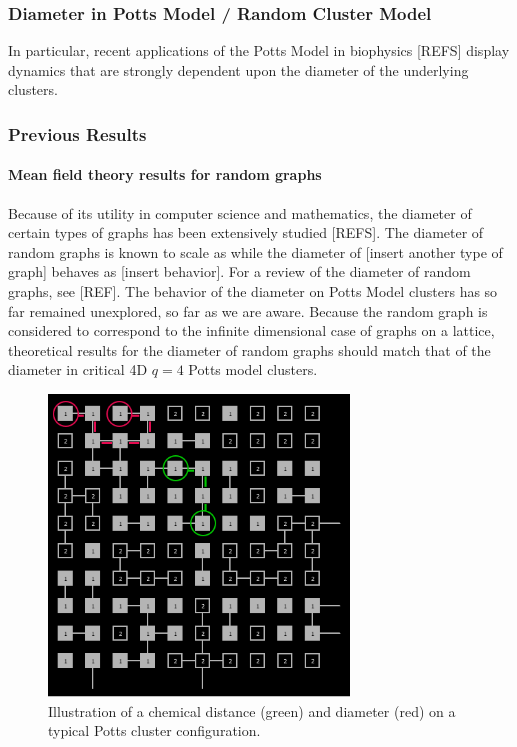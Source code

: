 \documentclass{article}
\begin{document}
\subsubsection{Diameter in Potts Model / Random Cluster Model}
\label{sec-1.3.2}

In particular, recent applications of the Potts Model in biophysics [REFS] display dynamics that are strongly dependent upon the diameter of the underlying clusters.
\subsubsection{Previous Results}
\label{sec-1.3.3}
\paragraph{Mean field theory results for random graphs}
\label{sec-1.3.3.1}

Because of its utility in computer science and mathematics, the diameter of certain types of graphs has been extensively studied [REFS].  The diameter of random graphs is known to scale as 
while the diameter of [insert another type of graph] behaves as [insert behavior].  For a review of the diameter of random graphs, see [REF].  The behavior of the diameter on Potts Model clusters has so far remained unexplored, so far as we are aware.  Because the random graph is considered to correspond to the infinite dimensional case of graphs on a lattice, theoretical results for the diameter of random graphs should match that of the diameter in critical 4D $q=4$ Potts model clusters.  

\begin{figure}[htbp]
\includegraphics[width=8cm]{fig2}
\caption[]{\label{fig:fig2} Illustration of a chemical distance (green) and diameter (red) on a typical Potts cluster configuration.}
\end{figure}
\end{document}
